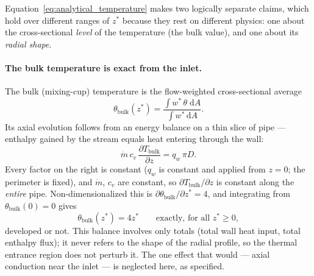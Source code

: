 \documentclass[12pt,a4paper]{article}
\newcommand{\parder}[2]{\frac{\partial #1}{\partial #2}}
\begin{document}
Equation~\eqref{eq:analytical_temperature} makes two logically separate claims, which hold over
different ranges of $z^*$ because they rest on different physics: one about the
cross-sectional \emph{level} of the temperature (the bulk value), and one about its \emph{radial
shape}.

\paragraph{The bulk temperature is exact from the inlet.}
The bulk (mixing-cup) temperature is the flow-weighted cross-sectional average
\begin{equation}
    \theta_{\text{bulk}}(z^*) =
        \frac{\displaystyle\int w^*\,\theta \; \mathrm{d}A}{\displaystyle\int w^* \, \mathrm{d}A}.
\end{equation}
Its axial evolution follows from an energy balance on a thin slice of pipe --- enthalpy gained
by the stream equals heat entering through the wall:
\begin{equation}
    \dot{m}\,c_v\,\parder{T_{\text{bulk}}}{z} = q_w\,\pi D .
\end{equation}
Every factor on the right is constant ($q_w$ is constant and applied from $z=0$; the perimeter
is fixed), and $\dot m$, $c_v$ are constant, so $\partial T_{\text{bulk}}/\partial z$ is constant
along the \emph{entire} pipe. Non-dimensionalized this is $\partial\theta_{\text{bulk}}/\partial
z^* = 4$, and integrating from $\theta_{\text{bulk}}(0)=0$ gives
\begin{equation}
    \theta_{\text{bulk}}(z^*) = 4z^* \qquad\text{exactly, for all } z^*\ge 0 ,
\end{equation}
developed or not. This balance involves only totals (total wall heat input, total enthalpy
flux); it never refers to the shape of the radial profile, so the thermal entrance region does
not perturb it. The one effect that would --- axial conduction near the inlet --- is neglected
here, as specified.
\end{document}
